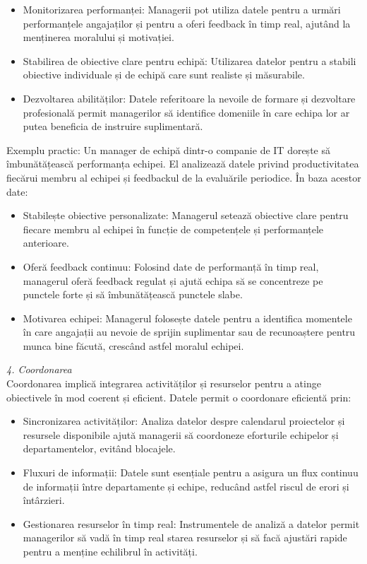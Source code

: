 \documentclass[
  11pt,
  b5paper,
  nottoc]{book}
\providecommand{\tightlist}{%
  \setlength{\itemsep}{0pt}\setlength{\parskip}{0pt}}\usepackage{longtable,booktabs,array}
\begin{document}
\begin{itemize}
\item
  Monitorizarea performanței: Managerii pot utiliza datele pentru a
  urmări performanțele angajaților și pentru a oferi feedback în timp
  real, ajutând la menținerea moralului și motivației.
\item
  Stabilirea de obiective clare pentru echipă: Utilizarea datelor pentru
  a stabili obiective individuale și de echipă care sunt realiste și
  măsurabile.
\item
  Dezvoltarea abilităților: Datele referitoare la nevoile de formare și
  dezvoltare profesională permit managerilor să identifice domeniile în
  care echipa lor ar putea beneficia de instruire suplimentară.
\end{itemize}

Exemplu practic: Un manager de echipă dintr-o companie de IT dorește să
îmbunătățească performanța echipei. El analizează datele privind
productivitatea fiecărui membru al echipei și feedbackul de la
evaluările periodice. În baza acestor date:

\begin{itemize}
\tightlist
\item
  Stabilește obiective personalizate: Managerul setează obiective clare
  pentru fiecare membru al echipei în funcție de competențele și
  performanțele anterioare.\\
\item
  Oferă feedback continuu: Folosind date de performanță în timp real,
  managerul oferă feedback regulat și ajută echipa să se concentreze pe
  punctele forte și să îmbunătățească punctele slabe.\\
\item
  Motivarea echipei: Managerul folosește datele pentru a identifica
  momentele în care angajații au nevoie de sprijin suplimentar sau de
  recunoaștere pentru munca bine făcută, crescând astfel moralul
  echipei.
\end{itemize}

\emph{4. Coordonarea}\\
Coordonarea implică integrarea activităților și resurselor pentru a
atinge obiectivele în mod coerent și eficient. Datele permit o
coordonare eficientă prin:

\begin{itemize}
\tightlist
\item
  Sincronizarea activităților: Analiza datelor despre calendarul
  proiectelor și resursele disponibile ajută managerii să coordoneze
  eforturile echipelor și departamentelor, evitând blocajele.\\
\item
  Fluxuri de informații: Datele sunt esențiale pentru a asigura un flux
  continuu de informații între departamente și echipe, reducând astfel
  riscul de erori și întârzieri.\\
\item
  Gestionarea resurselor în timp real: Instrumentele de analiză a
  datelor permit managerilor să vadă în timp real starea resurselor și
  să facă ajustări rapide pentru a menține echilibrul în activități.
\end{itemize}
\end{document}
